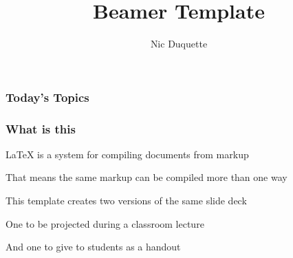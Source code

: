 \documentclass[aspectratio=169,handout]{beamer}
\title{Beamer Template}
\author{Nic Duquette}
\institute{USC Price}
\date{ }
\begin{document}
\begin{frame}
    \begin{center}
     	\Huge\inserttitle\par
\vspace{2em}

      \Large\insertauthor\par
      \Large\insertinstitute\par
            \bigskip
      \Large\insertdate\par
    \end{center}
\end{frame}



\begin{frame}
	\frametitle{Today's Topics}
	\Large\tableofcontents
\end{frame}









\begin{frame}
	\frametitle{What is this}
	\begin{witem}
		\item \LaTeX{} is a system for compiling documents from markup
		\item That means the same markup can be compiled more than one way
		\item This template creates two versions of the same slide deck
		\item One to be projected during a classroom lecture
		\item And one to give to students as a handout
	\end{witem}
\end{frame}
\end{document}
